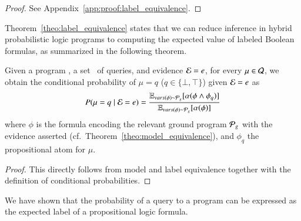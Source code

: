 \begin{proof}
See Appendix~\ref{app:proof:label_equivalence}.
\end{proof}

Theorem~\ref{theo:label_equivalence} states that we can reduce inference in hybrid probabilistic logic programs to computing the expected value of  labeled Boolean formulas, as summarized in the following theorem.
\begin{theorem}
\label{thm:inference-by-expectation}
Given a \dcproblogsty program \dcpprogram, a set \queryset\ of queries, and evidence $\mathcal{E} = e$, for every $\mu\in\mathcal{Q}$, we obtain the conditional probability of $\mu = q$ ($q\in \{\bot,\top \}$) given $\mathcal{E} = e$ as
\begin{align*}
    P(\mu=q\mid\mathcal{E} = e) = \frac{\operatorname*{\mathbb{E}}_{vars(\phi) \sim  \mathcal{P}_g} [\alpha( \phi \wedge \phi_q)] }{\operatorname*{\mathbb{E}}_{vars(\phi) \sim  \mathcal{P}_g} [\alpha( \phi )] }
\end{align*}
where $\phi$ is the formula encoding the relevant ground program $\mathcal{P}_g$ with  the evidence asserted  (cf.~Theorem~\ref{theo:model_equivalence}), and $\phi_q$ the propositional atom for $\mu$.
\end{theorem}
\begin{proof}
This directly follows from model and label equivalence together with the definition of conditional probabilities. 
\end{proof}

We have shown that the probability of a query to a \dcproblogsty program can be expressed as the expected label of a propositional logic formula.
































